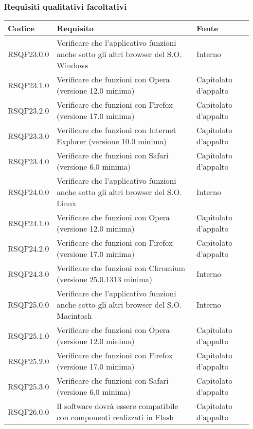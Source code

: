 \subsubsection{Requisiti qualitativi facoltativi}

\begin{center}
\begin{longtable}{lp{}l}
\toprule Codice & Requisito & Fonte\\
\midrule
RSQF23.0.0 & Verificare che l'applicativo funzioni anche sotto gli altri browser del S.O. Windows & Interno \\
RSQF23.1.0 & Verificare che funzioni con Opera (versione 12.0 minima) & Capitolato d'appalto \\
RSQF23.2.0 & Verificare che funzioni con Firefox (versione 17.0 minima) & Capitolato d'appalto \\
RSQF23.3.0 & Verificare che funzioni con Internet Explorer (versione 10.0 minima) & Capitolato d'appalto \\
RSQF23.4.0 & Verificare che funzioni con Safari (versione 6.0 minima) & Capitolato d'appalto \\
RSQF24.0.0 & Verificare che l'applicativo funzioni anche sotto gli altri browser del S.O. Linux & Interno \\
RSQF24.1.0 & Verificare che funzioni con Opera (versione 12.0 minima) & Capitolato d'appalto \\
RSQF24.2.0 & Verificare che funzioni con Firefox (versione 17.0 minima) & Capitolato d'appalto \\
RSQF24.3.0 & Verificare che funzioni con Chromium (versione 25.0.1313 minima) & Interno \\
RSQF25.0.0 & Verificare che l'applicativo funzioni anche sotto gli altri browser del S.O. Macintosh & Interno \\
RSQF25.1.0 & Verificare che funzioni con Opera (versione 12.0 minima) & Capitolato d'appalto \\
RSQF25.2.0 & Verificare che funzioni con Firefox (versione 17.0 minima) & Capitolato d'appalto \\
RSQF25.3.0 & Verificare che funzioni con Safari  (versione 6.0 minima) & Capitolato d'appalto \\
RSQF26.0.0 & Il software dovrà essere compatibile con componenti realizzati in Flash & Capitolato d'appalto \\
\bottomrule
\end{longtable}
\end{center}

